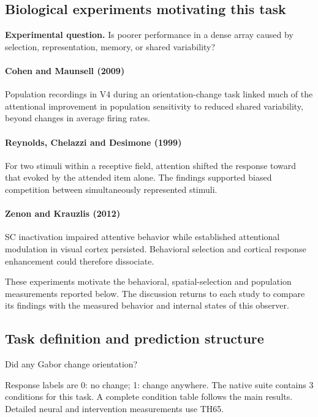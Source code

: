 \documentclass[11pt]{article}
\begin{document}
\subsection{Biological experiments motivating this task}
\textbf{Experimental question.} Is poorer performance in a dense array caused by selection, representation, memory, or shared variability?

\paragraph{Cohen and Maunsell (2009)} Population recordings in V4 during an orientation-change task linked much of the attentional improvement in population sensitivity to reduced shared variability, beyond changes in average firing rates. \cite{bio_cohen}

\paragraph{Reynolds, Chelazzi and Desimone (1999)} For two stimuli within a receptive field, attention shifted the response toward that evoked by the attended item alone. The findings supported biased competition between simultaneously represented stimuli. \cite{bio_competition}

\paragraph{Zenon and Krauzlis (2012)} SC inactivation impaired attentive behavior while established attentional modulation in visual cortex persisted. Behavioral selection and cortical response enhancement could therefore dissociate. \cite{bio_zenon}

These experiments motivate the behavioral, spatial-selection and population measurements reported below. The discussion returns to each study to compare its findings with the measured behavior and internal states of this observer.
\subsection{Task definition and prediction structure}
Did any Gabor change orientation?

Response labels are 0: no change; 1: change anywhere. The native suite contains 3 conditions for this task. A complete condition table follows the main results. Detailed neural and intervention measurements use TH65.
\end{document}

